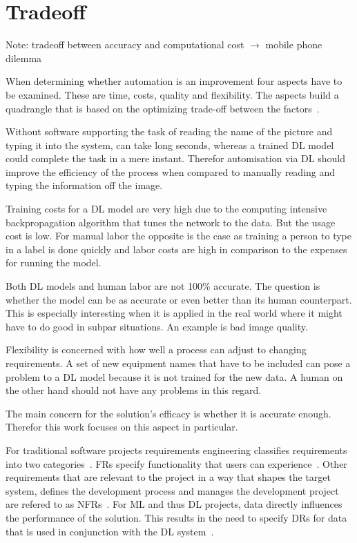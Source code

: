 \section{Tradeoff}
Note: tradeoff between accuracy and computational cost $\rightarrow$ mobile phone dilemma

When determining whether automation is an improvement four aspects have to be examined.
These are time, costs, quality and flexibility.
The aspects build a quadrangle that is based on the optimizing trade-off between the
factors~\cite{dumas_fundamentals_2013}.

Without software supporting the task of reading the name of the picture and typing it into
the system, can take long seconds, whereas a trained \ac{DL} model could complete the task
in a mere instant.
Therefor automisation via \ac{DL} should improve the efficiency of the process when compared to
manually reading and typing the information off the image.

Training costs for a \ac{DL} model are very high due to the computing intensive
backpropagation algorithm that tunes the network to the data.
But the usage cost is low.
For manual labor the opposite is the case as training a person to type in a label is done quickly
and labor costs are high in comparison to the expenses for running the model.

Both \ac{DL} models and human labor are not 100\% accurate.
The question is whether the model can be as accurate or even better than its human counterpart.
This is especially interesting when it is applied in the real world where it might have to do good
in subpar situations.
An example is bad image quality.

Flexibility is concerned with how well a process can adjust to changing requirements.
A set of new equipment names that have to be included can pose a problem to a \ac{DL} model
because it is not trained for the new data.
A human on the other hand should not have any problems in this regard.

The main concern for the solution's efficacy is whether it is accurate enough.
Therefor this work focuses on this aspect in particular.



For traditional software projects requirements engineering classifies requirements into
two categories~\cite{zowghi_requirements_2014}.
\Acp{FR} specify functionality that users can experience~\cite{noauthor_ieee_1998}.
Other requirements that are relevant to the project in a way that shapes the target system,
defines the development process and manages the development project are refered to as
\acp{NFR}~\cite{kotonya_requirements_1998,chung_non-functional_2009}.
For \ac{ML} and thus \ac{DL} projects, data directly influences the performance of the solution.
This results in the need to specify \acp{DR} for data that is used
in conjunction with the \ac{DL} system~\cite{vogelsang_requirements_2019}.

